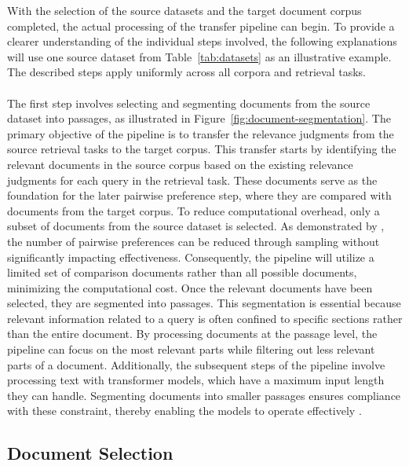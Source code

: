 With the selection of the source datasets and the target document corpus \mbox{completed}, the actual processing of the transfer pipeline can begin. To \mbox{provide} a clearer understanding of the individual steps involved, the following explanations will use one source dataset from Table~\ref{tab:datasets} as an illustrative example. The described steps apply uniformly across all corpora and retrieval tasks.
\\\\
The first step involves selecting and segmenting documents from the source dataset into passages, as illustrated in Figure~\ref{fig:document-segmentation}. The primary objective of the pipeline is to transfer the relevance judgments from the source retrieval tasks to the target corpus. This transfer starts by identifying the relevant documents in the source corpus based on the existing relevance judgments for each query in the retrieval task. These documents serve as the foundation for the later pairwise preference step, where they are compared with documents from the target corpus. To reduce computational overhead, only a subset of documents from the source dataset is selected. As demonstrated by \mbox{\cite{gienapp:2022}}, the number of pairwise preferences can be reduced through sampling without significantly impacting effectiveness. Consequently, the pipeline will utilize a limited set of comparison documents rather than all possible documents, minimizing the computational cost. Once the relevant documents have been selected, they are segmented into passages. This segmentation is essential because relevant information related to a query is often confined to specific sections rather than the entire document. By processing documents at the passage level, the pipeline can focus on the most relevant parts while filtering out less relevant parts of a document. Additionally, the subsequent steps of the pipeline involve processing text with transformer models, which have a maximum input length they can handle. Segmenting documents into smaller passages ensures compliance with these constraint, thereby enabling the models to operate effectively \cite{levy:2024}.

\subsection{Document Selection}\label{document-selection}

